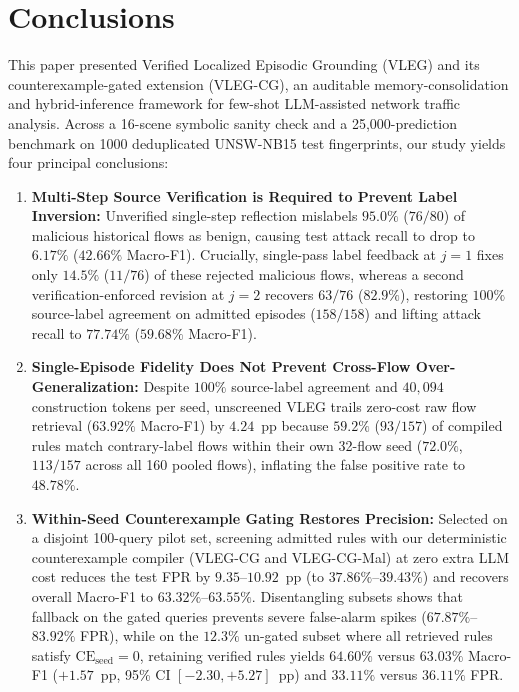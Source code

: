 \documentclass[10pt,a4paper,onecolumn]{article}
\theoremstyle{definition}
\theoremstyle{remark}
\begin{document}
\section{Conclusions}
This paper presented Verified Localized Episodic Grounding (VLEG) and its counterexample-gated extension (VLEG-CG), an auditable memory-consolidation and hybrid-inference framework for few-shot LLM-assisted network traffic analysis. Across a 16-scene symbolic sanity check and a 25,000-prediction benchmark on 1000 deduplicated UNSW-NB15 test fingerprints, our study yields four principal conclusions:
\begin{enumerate}[leftmargin=1.8em]
    \item \textbf{Multi-Step Source Verification is Required to Prevent Label Inversion:} Unverified single-step reflection mislabels $95.0\%$ ($76/80$) of malicious historical flows as benign, causing test attack recall to drop to $6.17\%$ ($42.66\%$ Macro-F1). Crucially, single-pass label feedback at $j=1$ fixes only $14.5\%$ ($11/76$) of these rejected malicious flows, whereas a second verification-enforced revision at $j=2$ recovers $63/76$ ($82.9\%$), restoring $100\%$ source-label agreement on admitted episodes ($158/158$) and lifting attack recall to $77.74\%$ ($59.68\%$ Macro-F1).
    \item \textbf{Single-Episode Fidelity Does Not Prevent Cross-Flow Over-Generalization:} Despite $100\%$ source-label agreement and $40,094$ construction tokens per seed, unscreened VLEG trails zero-cost raw flow retrieval ($63.92\%$ Macro-F1) by $4.24$~pp because $59.2\%$ ($93/157$) of compiled rules match contrary-label flows within their own 32-flow seed ($72.0\%$, $113/157$ across all 160 pooled flows), inflating the false positive rate to $48.78\%$.
    \item \textbf{Within-Seed Counterexample Gating Restores Precision:} Selected on a disjoint 100-query pilot set, screening admitted rules with our deterministic counterexample compiler (VLEG-CG and VLEG-CG-Mal) at zero extra LLM cost reduces the test FPR by $9.35$--$10.92$~pp (to $37.86\%$--$39.43\%$) and recovers overall Macro-F1 to $63.32\%$--$63.55\%$. Disentangling subsets shows that fallback on the gated queries prevents severe false-alarm spikes ($67.87\%$--$83.92\%$ FPR), while on the $12.3\%$ un-gated subset where all retrieved rules satisfy $\mathrm{CE}_{\mathrm{seed}}=0$, retaining verified rules yields $64.60\%$ versus $63.03\%$ Macro-F1 ($+1.57$~pp, 95\% CI $[-2.30, +5.27]$~pp) and $33.11\%$ versus $36.11\%$ FPR.

\end{enumerate}
\end{document}
